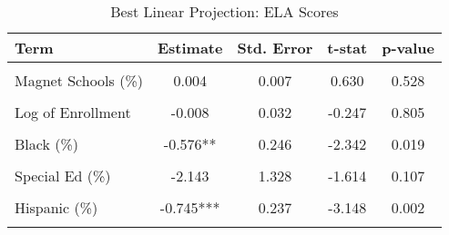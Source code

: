 \begin{table}[!h]
\centering
\caption{\label{tab:blp_ela}Best Linear Projection: ELA Scores}
\centering
\begin{tabular}[t]{lcccc}
\toprule
Term & Estimate & Std. Error & t-stat & p-value\\
\midrule
\cellcolor{gray!10}{(Intercept)} & \cellcolor{gray!10}{0.969**} & \cellcolor{gray!10}{0.395} & \cellcolor{gray!10}{2.450} & \cellcolor{gray!10}{0.014}\\
Magnet Schools (\%) & 0.004 & 0.007 & 0.630 & 0.528\\
\cellcolor{gray!10}{White (\%)} & \cellcolor{gray!10}{-0.58**} & \cellcolor{gray!10}{0.229} & \cellcolor{gray!10}{-2.532} & \cellcolor{gray!10}{0.011}\\
Log of Enrollment & -0.008 & 0.032 & -0.247 & 0.805\\
\cellcolor{gray!10}{Baseline Performance} & \cellcolor{gray!10}{-0.017} & \cellcolor{gray!10}{0.047} & \cellcolor{gray!10}{-0.359} & \cellcolor{gray!10}{0.720}\\
Black (\%) & -0.576** & 0.246 & -2.342 & 0.019\\
\cellcolor{gray!10}{Per Pupil Revenue} & \cellcolor{gray!10}{0} & \cellcolor{gray!10}{0.000} & \cellcolor{gray!10}{-1.112} & \cellcolor{gray!10}{0.266}\\
Special Ed (\%) & -2.143 & 1.328 & -1.614 & 0.107\\
\cellcolor{gray!10}{Total Spending (per-pupil)} & \cellcolor{gray!10}{0} & \cellcolor{gray!10}{0.000} & \cellcolor{gray!10}{0.627} & \cellcolor{gray!10}{0.530}\\
Hispanic (\%) & -0.745*** & 0.237 & -3.148 & 0.002\\
\cellcolor{gray!10}{TPS-Charter Spending (\% diff)} & \cellcolor{gray!10}{0.301***} & \cellcolor{gray!10}{0.109} & \cellcolor{gray!10}{2.772} & \cellcolor{gray!10}{0.006}\\
\bottomrule
\end{tabular}
\end{table}
